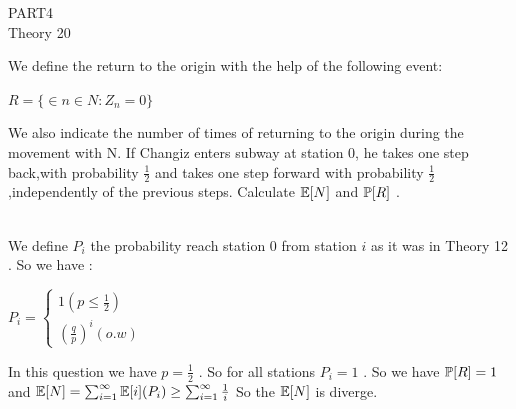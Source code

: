 \documentclass[30pt]{article}
\begin{document}
\newpage
{\LARGE \color{blue} PART4} \\
{\Large \color{blue} Theory 20 } \\
{\color{blue} We define the return to the origin with the help of the following event: 
\begin{center}
    $R = \{ \in n ∈ N : Z_n = 0 \}$
\end{center} We also indicate the number of times of returning to the origin during the movement with N. If Changiz enters subway at station 0, he takes one step back,with probability $\frac{1}{2}$ and takes one step forward with probability $\frac{1}{2}$,independently of the previous steps. Calculate $\Bbb{E}[N] $ and $\Bbb{P}[R] $ .} \\ \newline
We define $P_i$ the probability reach station $0$ from station $i$ as it was in {\color{blue} Theory 12} . So we have : \\ 
\begin{center}
    $P_i = \begin{cases}
        1 (p \le \frac{1}{2}) \\
        (\frac{q}{p})^i (o.w) 
    \end{cases} $
\end{center}
In this question we have $p = \frac{1}{2}$ . So for all stations $P_i = 1$ . So we have $\Bbb{P}[R] = 1 $ and $\Bbb{E}[N] = \sum_{i=1}^{\infty} \Bbb{E}[i] (P_i) \ge \sum_{i=1}^{\infty} \frac{1}{i} $ So the $\Bbb{E}[N]$ is diverge. \\
\end{document}
